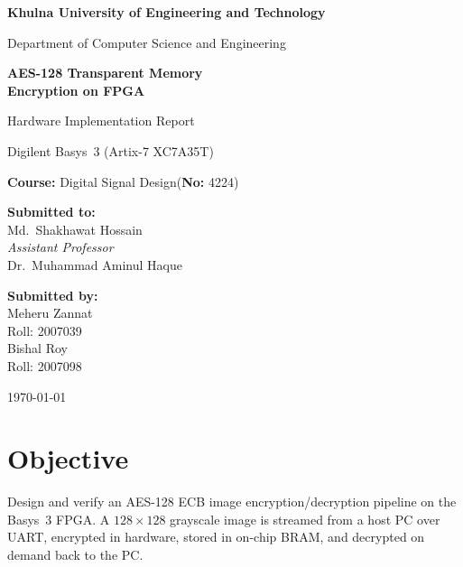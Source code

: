 \documentclass[11pt,a4paper]{article}
\begin{document}
\begin{titlepage}
\centering
\vspace*{1.5cm}
{\Large\bfseries Khulna University of Engineering and Technology\par}
\vspace{0.3cm}
{\large Department of Computer Science and Engineering\par}
\vspace{2.5cm}
{\huge\bfseries AES-128 Transparent Memory\\[4pt] Encryption on FPGA\par}
\vspace{0.6cm}
{\large Hardware Implementation Report\par}
{\normalsize Digilent Basys~3 (Artix-7 XC7A35T)\par}
\vspace{2.0cm}
{\large\bfseries Course:} Digital Signal Design\quad(\textbf{No:} 4224)\\[1.2cm]

\begin{minipage}{0.45\textwidth}
\begin{flushleft}\large
\textbf{Submitted to:}\\[4pt]
Md.\ Shakhawat Hossain\\
\textit{Assistant Professor}\\[6pt]
Dr.\ Muhammad Aminul Haque\\
\end{flushleft}
\end{minipage}
\hfill
\begin{minipage}{0.45\textwidth}
\begin{flushright}\large
\textbf{Submitted by:}\\[4pt]
Meheru Zannat\\
Roll: 2007039\\[6pt]
Bishal Roy\\
Roll: 2007098
\end{flushright}
\end{minipage}

\vfill
{\large \today\par}
\end{titlepage}

\section{Objective}
Design and verify an AES-128 ECB image encryption/decryption pipeline on
the Basys~3 FPGA. A $128{\times}128$ grayscale image is streamed from a
host PC over UART, encrypted in hardware, stored in on-chip BRAM, and
decrypted on demand back to the PC.
\end{document}
